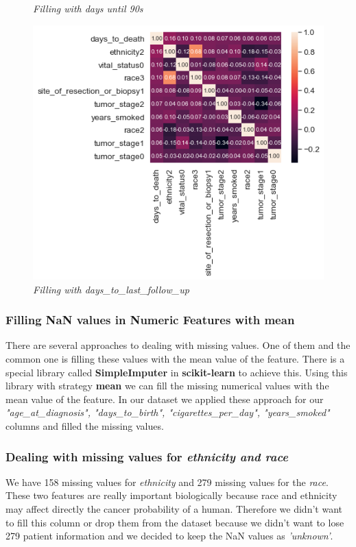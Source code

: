 \documentclass[onecolumn]{article}
\begin{document}
\begin{figure}[h]
\begin{minipage}{0.4\textwidth}
        \emph{\small Filling with days until 90s}\par\medskip
    \end{minipage}
    \bigbreak
    \begin{minipage}{0.4\textwidth}
        \centering
        \includegraphics[width=1.0\textwidth]{days_to_follow_up.png} %
        \emph{\small Filling with days\_to\_last\_follow\_up}\par\medskip
    \end{minipage}
\end{figure}

\subsubsection{Filling NaN values in Numeric Features with mean}
There are several approaches to dealing with missing values. One of them and the common one is filling these values with the mean value of the feature. There is a special library called \textbf{SimpleImputer} in \textbf{scikit-learn} to achieve this. Using this library with strategy \textbf{mean} we can fill the missing numerical values with the mean value of the feature. In our dataset we applied these approach for our \emph{"age\_at\_diagnosis", "days\_to\_birth", "cigarettes\_per\_day", "years\_smoked"} columns and filled the missing values.

\subsubsection{Dealing with missing values for \emph{ethnicity and race}}
We have 158 missing values for \emph{ethnicity} and 279 missing values for the \emph{race}. These two features are really important biologically because race and ethnicity may affect directly the cancer probability of a human. Therefore we didn't want to fill this column or drop them from the dataset because we didn't want to lose 279 patient information and we decided to keep the NaN values as \emph{'unknown'}.
\end{document}
